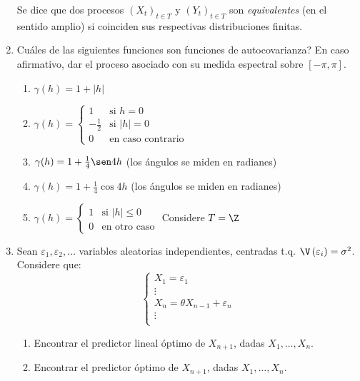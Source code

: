 \begin{enumerate}
\begin{definicion}
Se dice que dos procesos $(X_{t} )_{t\in T} $ y $(Y_{t} )_{t\in T} $ son \emph{equivalentes} (en el sentido amplio) si coinciden sus respectivas distribuciones finitas. 
\end{definicion}

\item Cu\'{a}les de las siguientes funciones son funciones de autocovarianza? En caso afirmativo, dar el proceso asociado con su medida espectral sobre $\left[ {-\pi ,\pi } \right]$.

\begin{enumerate}
\item $\gamma (h)=1+\left| h \right|$
\item $\gamma (h)=\begin{cases}
                   1&\text{si } h=0\\
                   -\frac 1 2&\text{si } |h|=0\\
                   0&\text{en caso contrario}
                  \end{cases}$

\item $\gamma (h)=1+\frac{1}{4}\sen 4h$ (los \'{a}ngulos se miden en radianes)

\item $\gamma (h)=1+\frac{1}{4}\cos 4h$ (los \'{a}ngulos se miden en radianes)

\item $\gamma (h)=\begin{cases}
                   1&\text{si } |h|\leq 0\\
                   0&\text{en otro caso}
                  \end{cases}$
Considere $T=\Z$
\end{enumerate}

\item Sean $\varepsilon_{1} ,\varepsilon_{2} ,\ldots$ variables aleatorias independientes, centradas t.q. $\V\left( \varepsilon_{i} \right)=\sigma^{2}$. Considere que: 
\[
\left\{ {\begin{array}{l}
 X_{1} =\varepsilon_{1} \\ 
 \vdots \\ 
 X_{n} =\theta X_{n-1} +\varepsilon_{n} \\ 
 \vdots \\ 
 \end{array}} \right.
\]
\begin{enumerate}
\item Encontrar el predictor lineal \'{o}ptimo de $X_{n+1} $, dadas $X_{1},\ldots, X_{n}$.
\item Encontrar el predictor \'{o}ptimo de $X_{n+1} $, dadas $X_{1},\ldots, X_{n} $.
\end{enumerate}

\end{enumerate}